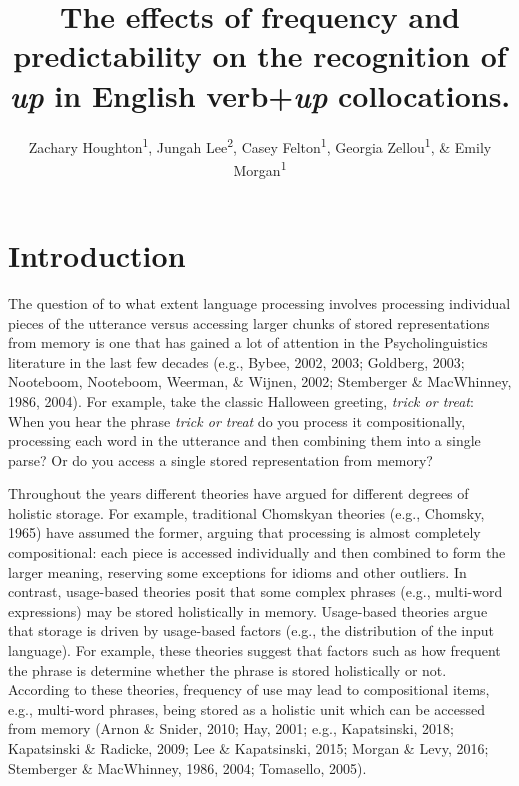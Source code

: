 \documentclass[
  man,floatsintext]{apa6}
\title{The effects of frequency and predictability on the recognition of \emph{up} in English verb+\emph{up} collocations.}
\author{Zachary Houghton\textsuperscript{1}, Jungah Lee\textsuperscript{2}, Casey Felton\textsuperscript{1}, Georgia Zellou\textsuperscript{1}, \& Emily Morgan\textsuperscript{1}}
\date{}
\affiliation{\vspace{0.5cm}\textsuperscript{1} University of California, Davis\\\textsuperscript{2} Chosun University}
\begin{document}
\maketitle

\section{Introduction}\label{introduction}

The question of to what extent language processing involves processing individual pieces of the utterance versus accessing larger chunks of stored representations from memory is one that has gained a lot of attention in the Psycholinguistics literature in the last few decades (e.g., Bybee, 2002, 2003; Goldberg, 2003; Nooteboom, Nooteboom, Weerman, \& Wijnen, 2002; Stemberger \& MacWhinney, 1986, 2004). For example, take the classic Halloween greeting, \emph{trick or treat}: When you hear the phrase \emph{trick or treat} do you process it compositionally, processing each word in the utterance and then combining them into a single parse? Or do you access a single stored representation from memory?

Throughout the years different theories have argued for different degrees of holistic storage. For example, traditional Chomskyan theories (e.g., Chomsky, 1965) have assumed the former, arguing that processing is almost completely compositional: each piece is accessed individually and then combined to form the larger meaning, reserving some exceptions for idioms and other outliers. In contrast, usage-based theories posit that some complex phrases (e.g., multi-word expressions) may be stored holistically in memory. Usage-based theories argue that storage is driven by usage-based factors (e.g., the distribution of the input language). For example, these theories suggest that factors such as how frequent the phrase is determine whether the phrase is stored holistically or not. According to these theories, frequency of use may lead to compositional items, e.g., multi-word phrases, being stored as a holistic unit which can be accessed from memory (Arnon \& Snider, 2010; Hay, 2001; e.g., Kapatsinski, 2018; Kapatsinski \& Radicke, 2009; Lee \& Kapatsinski, 2015; Morgan \& Levy, 2016; Stemberger \& MacWhinney, 1986, 2004; Tomasello, 2005).
\end{document}

